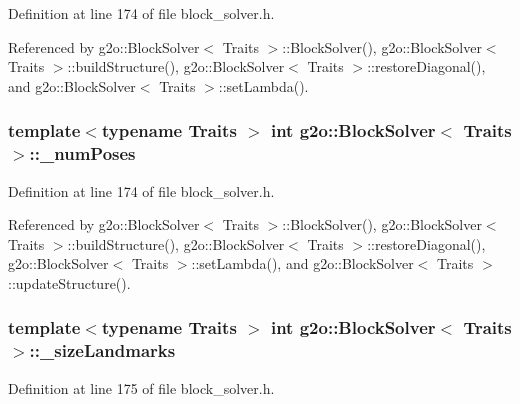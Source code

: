 Definition at line 174 of file block\+\_\+solver.\+h.



Referenced by g2o\+::\+Block\+Solver$<$ Traits $>$\+::\+Block\+Solver(), g2o\+::\+Block\+Solver$<$ Traits $>$\+::build\+Structure(), g2o\+::\+Block\+Solver$<$ Traits $>$\+::restore\+Diagonal(), and g2o\+::\+Block\+Solver$<$ Traits $>$\+::set\+Lambda().

\subsubsection[{\texorpdfstring{\+\_\+num\+Poses}{_numPoses}}]{\setlength{\rightskip}{0pt plus 5cm}template$<$typename Traits $>$ int {\bf g2o\+::\+Block\+Solver}$<$ Traits $>$\+::\+\_\+num\+Poses\hspace{0.3cm}{\ttfamily [protected]}}\hypertarget{classg2o_1_1BlockSolver_a709259fc290d746f4174d25410b7458a}{}\label{classg2o_1_1BlockSolver_a709259fc290d746f4174d25410b7458a}


Definition at line 174 of file block\+\_\+solver.\+h.



Referenced by g2o\+::\+Block\+Solver$<$ Traits $>$\+::\+Block\+Solver(), g2o\+::\+Block\+Solver$<$ Traits $>$\+::build\+Structure(), g2o\+::\+Block\+Solver$<$ Traits $>$\+::restore\+Diagonal(), g2o\+::\+Block\+Solver$<$ Traits $>$\+::set\+Lambda(), and g2o\+::\+Block\+Solver$<$ Traits $>$\+::update\+Structure().

\subsubsection[{\texorpdfstring{\+\_\+size\+Landmarks}{_sizeLandmarks}}]{\setlength{\rightskip}{0pt plus 5cm}template$<$typename Traits $>$ int {\bf g2o\+::\+Block\+Solver}$<$ Traits $>$\+::\+\_\+size\+Landmarks\hspace{0.3cm}{\ttfamily [protected]}}\hypertarget{classg2o_1_1BlockSolver_a13a49b5aac8ae3b12ed0c349fc0788e7}{}\label{classg2o_1_1BlockSolver_a13a49b5aac8ae3b12ed0c349fc0788e7}


Definition at line 175 of file block\+\_\+solver.\+h.



